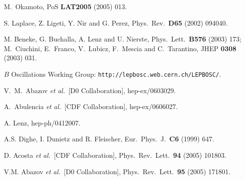 \documentclass[11pt]{cernrep}
\begin{document}
\begin{thebibliography}{999}
M.~Okamoto,
 { PoS {\bf LAT2005}} (2005) 013.

S. Laplace, Z. Ligeti, Y. Nir and G. Perez,
{Phys.\ Rev.}~{\bf D65} (2002) 094040.

M. Beneke, G. Buchalla, A. Lenz and U. Nierste,
{ Phys.\ Lett.}~{\bf B576} (2003) 173;\\
M.~Ciuchini, E.~Franco, V.~Lubicz, F.~Mescia and C.~Tarantino,
{ JHEP} {\bf 0308} (2003) 031.

$B$ Oscillations Working Group:
{\tt http://lepbosc.web.cern.ch/LEPBOSC/}.

 V.~M.~Abazov {\it et al.}\  [D0 Collaboration],
  hep-ex/0603029.

A.~Abulencia {\it et al.}\ [CDF Collaboration],
  hep-ex/0606027.
  
A. Lenz,
  hep-ph/0412007.
  
A.S. Dighe, I. Dunietz and R. Fleischer,
{ Eur.\ Phys.\ J.}~{\bf C6} (1999) 647.

D. Acosta {\it et al.}\  [CDF Collaboration],
  { Phys.\ Rev.\ Lett.}~{\bf 94} (2005) 101803.

V.M. Abazov {\it et al.}\  [D0 Collaboration],
  { Phys.\ Rev.\ Lett.}~{\bf 95} (2005) 171801.


\end{thebibliography}
\end{document}
